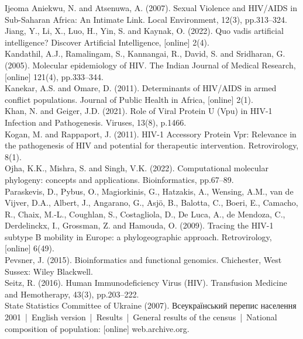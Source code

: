 Ijeoma Aniekwu, N. and Atsenuwa, A. (2007). Sexual Violence and HIV/AIDS in Sub-Saharan Africa: An Intimate Link. Local Environment, 12(3), pp.313–324.\\

Jiang, Y., Li, X., Luo, H., Yin, S. and Kaynak, O. (2022). Quo vadis artificial intelligence? Discover Artificial Intelligence, [online] 2(4).\\

Kandathil,         A.J., Ramalingam, S., Kannangai, R., David, S. and Sridharan, G. (2005). Molecular epidemiology of HIV. The Indian Journal of Medical Research, [online] 121(4), pp.333–344.\\

Kanekar, A.S. and Omare, D. (2011). Determinants of HIV/AIDS in armed conflict populations. Journal of Public Health in Africa, [online] 2(1).\\

Khan,  N. and Geiger, J.D. (2021). Role of Viral Protein U (Vpu) in HIV-1 Infection and Pathogenesis. Viruses, 13(8), p.1466.\\

Kogan,             M. and Rappaport, J. (2011). HIV-1 Accessory Protein Vpr: Relevance in the pathogenesis of HIV and potential for therapeutic intervention. Retrovirology, 8(1).\\

Ojha,              K.K., Mishra, S. and Singh, V.K. (2022). Computational molecular phylogeny: concepts and applications. Bioinformatics, pp.67–89.\\

Paraskevis,               D., Pybus, O., Magiorkinis, G., Hatzakis, A., Wensing, A.M., van de Vijver, D.A., Albert, J., Angarano, G., Asjö, B., Balotta, C., Boeri, E., Camacho, R., Chaix, M.-L., Coughlan, S., Costagliola, D., De Luca, A., de Mendoza, C., Derdelinckx, I., Grossman, Z. and Hamouda, O. (2009). Tracing the HIV-1 subtype B mobility in Europe: a phylogeographic approach. Retrovirology, [online] 6(49).\\

Pevsner,               J. (2015). Bioinformatics and functional genomics. Chichester, West Sussex: Wiley Blackwell.\\

Seitz, R. (2016). Human Immunodeficiency Virus (HIV). Transfusion Medicine and Hemotherapy, 43(3), pp.203–222.\\

State               Statistics Committee of Ukraine (2007). Всеукраїнський перепис населення 2001 | English version | Results | General results of the census | National composition of population: [online] web.archive.org. \\



